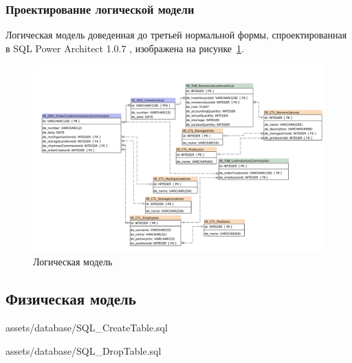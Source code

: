 
\subsubsection{Проектирование логической модели}

Логическая модель доведенная до третьей нормальной формы,
спроектированная в SQL Power Architect 1.0.7 \cite{SqlPowerArhitect},
изображена на рисунке~\ref{fig:ArchitectureDatabase}.

\begin{figure}[!h]
    \centering

    \includegraphics[width=18cm]
    {assets/database/LogicModel.SqlPowerArchitect.architect.pdf}

    \caption{Логическая модель}

    \label{fig:ArchitectureDatabase}
\end{figure}

\newpage
\subsection{Физическая модель}


{assets/database/SQL_CreateTable.sql}

\newpage


{assets/database/SQL_DropTable.sql}

\newpage
